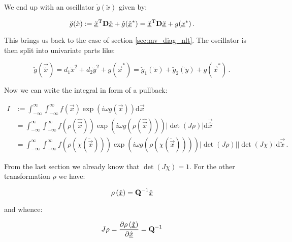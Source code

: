 \documentclass[a4paper,10pt]{article}
\begin{document}
We end up with an oscillator $\breve{g}(\breve{x})$ given by:

\begin{equation}
 \breve{g}(\breve{x}) := \underline{\breve{x}}{}^{\textnormal{T}} \mathbf{D} \underline{\breve{x}} + \hat{g}(\underline{\hat{x}}^{*})
                       = \underline{\breve{x}}{}^{\textnormal{T}} \mathbf{D} \underline{\breve{x}} + g(\underline{x}^{*}) \,.
\end{equation}

This brings us back to the case of section \ref{sec:mv_diag_nlt}.
The oscillator is then split into univariate parts like:

\begin{equation}
 \breve{g}(\vec{\breve{x}}) = d_{1} \breve{x}^2 + d_{2} \breve{y}^2 + g\left(\vec{x}^{*}\right)
                            = \breve{g}_1(\breve{x}) + \breve{g}_2(\breve{y}) + g\left(\vec{x}^{*}\right) \,.
\end{equation}

Now we can write the integral in form of a pullback:

\begin{equation}
\begin{split}
 I & := \int_{-\infty}^{\infty} \int_{-\infty}^{\infty} f(\vec{x})
          \exp\left(i \omega g(\vec{x})\right) \mathrm{d}\vec{x} \\
   &  = \int_{-\infty}^{\infty} \int_{-\infty}^{\infty}
          f\left(\rho\left(\hat{\vec{x}}\right)\right)
          \exp\left(i \omega g\left(\rho\left(\hat{\vec{x}}\right)\right)\right)
          |\det(J\rho)|
        \mathrm{d}\vec{\hat{x}} \\
   &  = \int_{-\infty}^{\infty} \int_{-\infty}^{\infty}
          f\left(\rho\left(\chi\left(\breve{\vec{x}}\right)\right)\right)
          \exp\left(i \omega g\left(\rho\left(\chi\left(\breve{\vec{x}}\right)\right)\right)\right)
          |\det(J\rho)||\det(J\chi)|
        \mathrm{d}\vec{\breve{x}} \,.
\end{split}
\end{equation}

From the last section we already know that $\det(J\chi) = 1$. For the
other transformation $\rho$ we have:

\begin{equation}
 \rho\left(\underline{\hat{x}}\right) = \mathbf{Q}{}^{-1} \underline{\hat{x}}
\end{equation}

and whence:

\begin{equation}
 J\rho = \frac{\partial \rho\left(\underline{\hat{x}}\right)}{\partial \underline{\hat{x}}} = \mathbf{Q}{}^{-1}
\end{equation}
\end{document}
